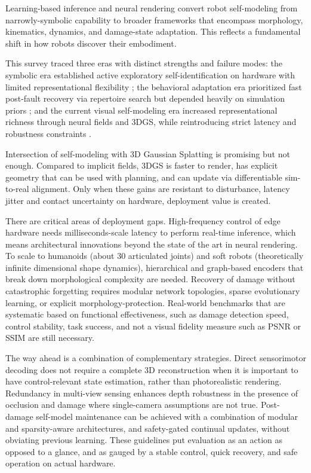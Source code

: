 \documentclass[11pt,a4paper]{article}
\begin{document}
Learning-based inference and neural rendering convert robot self-modeling from narrowly-symbolic capability to broader frameworks that encompass morphology, kinematics, dynamics, and damage-state adaptation. This reflects a fundamental shift in how robots discover their embodiment.

This survey traced three eras with distinct strengths and failure modes: the symbolic era established active exploratory self-identification on hardware with limited representational flexibility \cite{bongard2006resilient}; the behavioral adaptation era prioritized fast post-fault recovery via repertoire search but depended heavily on simulation priors \cite{cully2015robots}; and the current visual self-modeling era increased representational richness through neural fields and 3DGS, while reintroducing strict latency and robustness constraints \cite{chen2022full,hu2024teaching,hu2025learning}.

Intersection of self-modeling with 3D Gaussian Splatting is promising but not enough. Compared to implicit fields, 3DGS is faster to render, has explicit geometry that can be used with planning, and can update via differentiable sim-to-real alignment. Only when these gains are resistant to disturbance, latency jitter and contact uncertainty on hardware, deployment value is created.

There are critical areas of deployment gaps. High-frequency control of edge hardware needs milliseconds-scale latency to perform real-time inference, which means architectural innovations beyond the state of the art in neural rendering. To scale to humanoids (about 30 articulated joints) and soft robots (theoretically infinite dimensional shape dynamics), hierarchical and graph-based encoders that break down morphological complexity are needed. Recovery of damage without catastrophic forgetting requires modular network topologies, sparse evolutionary learning, or explicit morphology-protection. Real-world benchmarks that are systematic based on functional effectiveness, such as damage detection speed, control stability, task success, and not a visual fidelity measure such as PSNR or SSIM are still necessary.

The way ahead is a combination of complementary strategies. Direct sensorimotor decoding does not require a complete 3D reconstruction when it is important to have control-relevant state estimation, rather than photorealistic rendering. Redundancy in multi-view sensing enhances depth robustness in the presence of occlusion and damage where single-camera assumptions are not true. Post-damage self-model maintenance can be achieved with a combination of modular and sparsity-aware architectures, and safety-gated continual updates, without obviating previous learning. These guidelines put evaluation as an action as opposed to a glance, and as gauged by a stable control, quick recovery, and safe operation on actual hardware.
\end{document}
